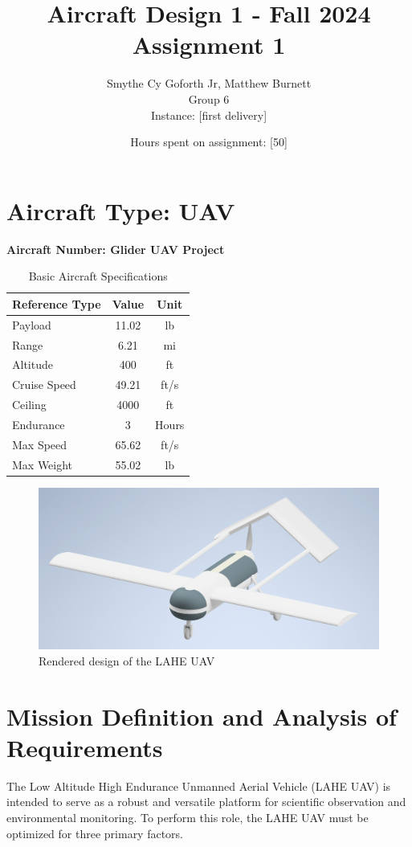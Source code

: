 \documentclass[12pt]{article}
\title{Aircraft Design 1 - Fall 2024 \\ Assignment 1}
\author{Smythe Cy Goforth Jr, Matthew Burnett \\ Group 6 \\ Instance: [first delivery]}
\date{Hours spent on assignment: [50]}
\begin{document}
	
	\maketitle
	
	\section*{Aircraft Type: UAV}
	\textbf{Aircraft Number: Glider UAV Project}
	
	\begin{table}[h!]
		\centering
		\begin{tabular}{|l|c|c|}
			\hline
			Reference Type & Value & Unit \\ 
			\hline
			Payload & 11.02 & lb \\ 
			Range & 6.21 & mi \\ 
			Altitude & 400 & ft \\ 
			Cruise Speed & 49.21 & ft/s \\ 
			Ceiling & 4000 & ft \\ 
			Endurance & 3 & Hours \\ 
			Max Speed & 65.62 & ft/s \\ 
			Max Weight & 55.02 & lb \\ 
			\hline
		\end{tabular}
		\caption{Basic Aircraft Specifications}
	\end{table}

	\begin{figure}[h!]
		\centering
		\includegraphics[width=6 in]{Media/Drone.png} %
		\caption{Rendered design of the LAHE UAV}
	\end{figure}
	
	\newpage
	
	\tableofcontents
	
	\newpage
	
	\section{Mission Definition and Analysis of Requirements}
	The Low Altitude High Endurance Unmanned Aerial Vehicle (LAHE UAV) is intended to serve as a robust and versatile platform for scientific observation and environmental monitoring. To perform this role, the LAHE UAV must be optimized for three primary factors.
	
\end{document}

